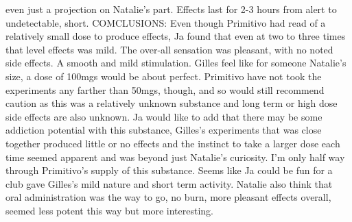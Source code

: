 \documentclass[12pt]{book}
\begin{document}
even just a projection on Natalie's part. Effects last for 2-3 hours from alert to undetectable, short. COMCLUSIONS: Even though Primitivo had read of a relatively small dose to produce effects, Ja found that even at two to three times that level effects was mild. The over-all sensation was pleasant, with no noted side effects. A smooth and mild stimulation. Gilles feel like for someone Natalie's size, a dose of 100mgs would be about perfect. Primitivo have not took the experiments any farther than 50mgs, though, and so would still recommend caution as this was a relatively unknown substance and long term or high dose side effects are also unknown. Ja would like to add that there may be some addiction potential with this substance, Gilles's experiments that was close together produced little or no effects and the instinct to take a larger dose each time seemed apparent and was beyond just Natalie's curiosity. I'm only half way through Primitivo's supply of this substance. Seems like Ja could be fun for a club gave Gilles's mild nature and short term activity. Natalie also think that oral administration was the way to go, no burn, more pleasant effects overall, seemed less potent this way but more interesting.
\end{document}
